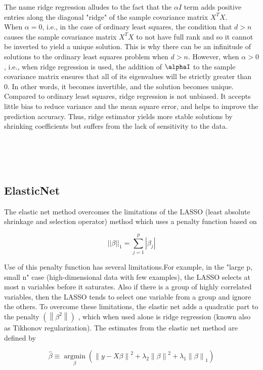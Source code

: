 \documentclass[conference]{IEEEtran}
\begin{document}
The name ridge regression alludes to the fact that the $\alpha I$ term adds positive entries along the diagonal "ridge" of the sample covariance matrix $X^{T}X$.
~\\
When $\alpha=0$, i.e., in the case of ordinary least squares, the condition that $d>n$ causes the sample covariance matrix $X^{T}X$ to not have full rank and so it cannot be inverted to yield a unique solution. This is why there can be an infinitude of solutions to the ordinary least squares problem when $d>n$. However, when $\alpha>0$, i.e., when ridge regression is used, the addition of $\alphaI$ to the sample covariance matrix ensures that all of its eigenvalues will be strictly greater than 0. In other words, it becomes invertible, and the solution becomes unique.
~\\
Compared to ordinary least squares, ridge regression is not unbiased. It accepts little bias to reduce variance and the mean square error, and helps to improve the prediction accuracy. Thus, ridge estimator yields more stable solutions by shrinking coefficients but suffers from the lack of sensitivity to the data.

~\\
~\\
~\\
\subsection{ElasticNet}
The elastic net method overcomes the limitations of the LASSO (least absolute shrinkage and selection operator) method which uses a penalty function based on

$$||\beta ||_{1} =  {\textstyle \sum_{j=1}^{p}} |\beta_{j} |$$

Use of this penalty function has several limitations.For example, in the "large p, small n" case (high-dimensional data with few examples), the LASSO selects at most n variables before it saturates. Also if there is a group of highly correlated variables, then the LASSO tends to select one variable from a group and ignore the others. To overcome these limitations, the elastic net adds a quadratic part to the penalty $\left ( \left \| \beta ^{2}  \right \|  \right )$ , which when used alone is ridge regression (known also as Tikhonov regularization). The estimates from the elastic net method are defined by

$$\widehat{\beta} \equiv \mathop{argmin}\limits_{\beta}(\left \| y-X\beta  \right \| ^2+\lambda _2\left \|  \beta \right \|^2+ 
\lambda _1\left \|  \beta \right \|_1)$$
\end{document}
